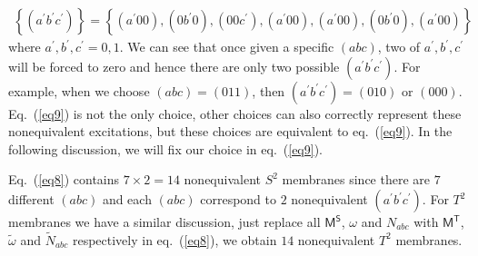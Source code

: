 \documentclass[11pt,nofootinbib,preprint]{revtex4-1}
\begin{document}
\begin{align}
	\left\{ \left( a^{\prime}b^{\prime}c^{\prime} \right) \right\} =\left\{ \left( a^{\prime}00 \right) ,\left( 0b^{\prime}0 \right) ,\left( 00c^{\prime} \right) ,\left( a^{\prime}00 \right) ,\left( a^{\prime}00 \right) ,\left( 0b^{\prime}0 \right) ,\left( a^{\prime}00 \right) \right\}  
	\label{eq9}
\end{align}
where $a^{\prime},b^{\prime},c^{\prime}=0,1$. We can see that once given a specific $\left( abc \right)$, two of $a^{\prime},b^{\prime},c^{\prime}$ will be forced to zero and hence there are only two possible $\left( a^{\prime}b^{\prime}c^{\prime} \right)$. For example, when we choose $\left( abc \right)=\left( 011 \right)$, then $\left( a^{\prime}b^{\prime}c^{\prime} \right)=\left( 010 \right)$ or $\left( 000 \right)$. Eq.~(\ref{eq9}) is not the only choice, other choices can also correctly represent these nonequivalent excitations, but these choices are equivalent to eq.~(\ref{eq9}). In the following discussion, we will fix our choice in eq.~(\ref{eq9}).

Eq.~(\ref{eq8}) contains $7\times2=14$ nonequivalent $S^2$ membranes since there are $7$ different $\left( abc \right)$ and each $\left( abc \right)$ correspond to $2$ nonequivalent $\left( a^{\prime}b^{\prime}c^{\prime} \right)$. For $T^2$ membranes we have a similar discussion, just replace all $\mathsf{M^S}$, $\omega$ and $N_{abc}$ with $\mathsf{M^T}$, $\tilde{\omega}$ and $\tilde{N}_{abc}$ respectively in eq.~(\ref{eq8}), we obtain $14$ nonequivalent $T^2$ membranes.
\end{document}
